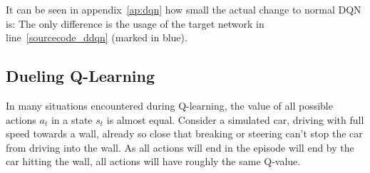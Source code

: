 It can be seen in appendix~\ref{ap:dqn} how small the actual change to normal DQN is: The only difference is the usage of the target network in line~\ref{sourcecode_ddqn} (marked in blue).

\subsection{Dueling Q-Learning}

\label{sec:dueling}

In many situations encountered during Q-learning, the value of all possible actions $a_t$ in a state $s_t$ is almost equal. Consider a simulated car, driving with full speed towards a wall, already so close that breaking or steering can't stop the car from driving into the wall. As all actions will end in the episode will end by the car hitting the wall, all actions will have roughly the same Q-value. 

